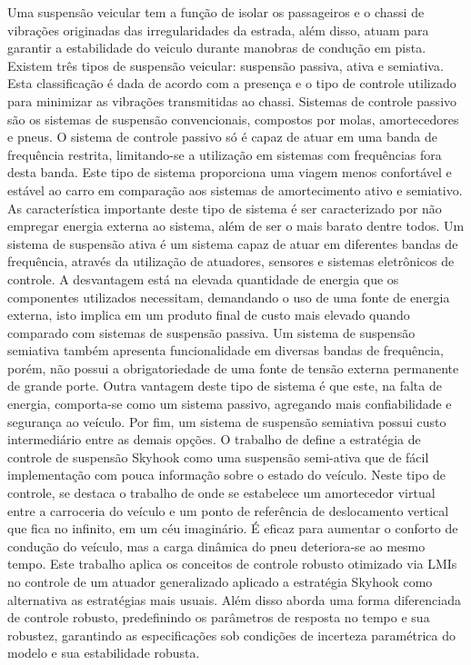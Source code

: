 Uma suspensão veicular tem a função de isolar os passageiros e o chassi de vibrações originadas das irregularidades da estrada, além disso, atuam para garantir a estabilidade do veiculo durante manobras de condução em pista.
Existem três tipos de suspensão veicular: suspensão passiva, ativa e semiativa. Esta classificação é dada de acordo com a presença e o tipo de controle utilizado para minimizar as vibrações transmitidas ao chassi.
Sistemas de controle passivo são os sistemas de suspensão convencionais, compostos por molas, amortecedores e pneus. O sistema de controle passivo só é capaz de atuar em uma banda de frequência restrita, limitando-se a utilização em sistemas com frequências fora desta banda. Este tipo de sistema proporciona uma viagem menos confortável e estável ao carro em comparação aos sistemas de amortecimento ativo e semiativo. As característica importante deste tipo de sistema é ser caracterizado por não empregar energia externa ao sistema, além de ser o mais barato dentre todos.
Um sistema de suspensão ativa é um sistema capaz de atuar em diferentes bandas de frequência, através da utilização de atuadores, sensores e sistemas eletrônicos de controle. A desvantagem está na elevada quantidade de energia que os componentes utilizados necessitam, demandando o uso de uma fonte de energia externa, isto implica em um produto final de custo mais elevado quando comparado com sistemas de suspensão passiva.
Um sistema de suspensão semiativa também apresenta funcionalidade em diversas bandas de frequência, porém, não possui a obrigatoriedade de uma fonte de tensão externa permanente de grande porte. Outra vantagem deste tipo de sistema é que este, na falta de energia, comporta-se como um sistema passivo, agregando mais confiabilidade e segurança ao veículo. Por fim, um sistema de suspensão semiativa possui custo intermediário entre as demais opções.
O trabalho de \cite{Liu2019GeneralDesign} define a estratégia de controle  de suspensão Skyhook como uma suspensão semi-ativa que de fácil implementação com pouca informação sobre o estado do veículo. Neste tipo de controle, se destaca o trabalho de \cite{Karnopp1995ActiveAS} onde se estabelece um amortecedor virtual entre a carroceria do veículo e um ponto de referência de deslocamento vertical que fica no infinito, em um céu imaginário. É eficaz para aumentar o conforto de condução do veículo, mas a carga dinâmica do pneu deteriora-se ao mesmo tempo. 
Este trabalho aplica os conceitos de controle robusto otimizado via LMIs no controle de um atuador generalizado aplicado a estratégia Skyhook como alternativa as estratégias mais usuais. Além disso aborda uma forma diferenciada de controle robusto, predefinindo os parâmetros de resposta no tempo e sua robustez, garantindo as especificações sob condições de incerteza paramétrica do modelo e sua estabilidade robusta.